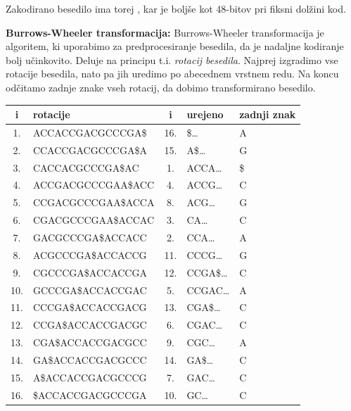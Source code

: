 \documentclass{article}
\begin{document}
\begin{enumerate}
\begin{enumerate}
			Zakodirano besedilo ima torej , kar je boljše kot 48-bitov pri fiksni
			dolžini kod.

			\textbf{Burrows-Wheeler transformacija:} Burrows-Wheeler transformacija je algoritem,
			ki uporabimo za predprocesiranje besedila, da je nadaljne kodiranje bolj
			učinkovito. Deluje na principu t.i. \textit{rotacij besedila}. Najprej izgradimo vse 
			rotacije besedila, nato pa jih uredimo po abecednem vrstnem redu. Na koncu
			odčitamo zadnje znake vseh rotacij, da dobimo transformirano besedilo.

			\begin{center}
				\begin{tabular}{|c|l||c|l|l|}
					\hline
					i & rotacije & i & urejeno & zadnji znak \\
					\hline
					1. & ACCACCGACGCCCGA\$ & 16. & \$\dots & A  \\
					\hline
					2. & CCACCGACGCCCGA\$A & 15. & A\$\dots & G  \\
					\hline
					3. & CACCACGCCCGA\$AC & 1. & ACCA\dots & \$ \\
					\hline
					4. & ACCGACGCCCGAA\$ACC & 4. & ACCG\dots & C  \\
					\hline
					5. & CCGACGCCCGAA\$ACCA & 8. & ACG\dots & G  \\
					\hline
					6. & CGACGCCCGAA\$ACCAC & 3. & CA\dots & C  \\
					\hline
					7. & GACGCCCGA\$ACCACC & 2. & CCA\dots & A  \\
					\hline
					8. & ACGCCCGA\$ACCACCG & 11. & CCCG\dots & G  \\
					\hline
					9. & CGCCCGA\$ACCACCGA & 12. & CCGA\$\dots & C  \\
					\hline
					10. &  GCCCGA\$ACCACCGAC & 5. & CCGAC\dots & A  \\
					\hline
					11. &  CCCGA\$ACCACCGACG & 13. & CGA\$\dots & C  \\
					\hline
					12. &  CCGA\$ACCACCGACGC & 6. & CGAC\dots & C \\
					\hline
					13. &  CGA\$ACCACCGACGCC & 9. & CGC\dots & A  \\
					\hline
					14. &  GA\$ACCACCGACGCCC & 14. & GA\$\dots & C  \\
					\hline
					15. &  A\$ACCACCGACGCCCG & 7. & GAC\dots & C  \\
					\hline
					16. &  \$ACCACCGACGCCCGA & 10. & GC\dots & C  \\
					\hline
				\end{tabular}
			\end{center}


\end{enumerate}
\end{enumerate}
\end{document}
